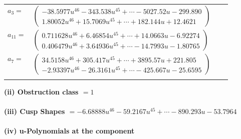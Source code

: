 \documentclass[1p]{elsarticle_modified}
\theoremstyle{definition}
\begin{document}
\begin{tabular}{m{7pt} m{180pt} m{7pt} m{180pt} }
\flushright $a_{3}=$&$\begin{pmatrix}-38.5977 u^{46}-343.538 u^{45}+\cdots-5027.52 u-299.890\\1.80052 u^{46}+15.7069 u^{45}+\cdots+182.144 u+12.4621\end{pmatrix}$ \\
\flushright $a_{11}=$&$\begin{pmatrix}0.711628 u^{46}+6.46854 u^{45}+\cdots+14.0663 u-6.92274\\0.406479 u^{46}+3.64936 u^{45}+\cdots-14.7993 u-1.80765\end{pmatrix}$ \\
\flushright $a_{7}=$&$\begin{pmatrix}34.5158 u^{46}+305.417 u^{45}+\cdots+3895.57 u+221.805\\-2.93397 u^{46}-26.3161 u^{45}+\cdots-425.667 u-25.6595\end{pmatrix}$\\&\end{tabular}
\flushleft \textbf{(ii) Obstruction class $= 1$}\\~\\
\flushleft \textbf{(iii) Cusp Shapes $= -6.68888 u^{46}-59.2167 u^{45}+\cdots-890.293 u-53.7964$}\\~\\
\newpage\renewcommand{\arraystretch}{1}
\flushleft \textbf{(iv) u-Polynomials at the component}\newline \\
\end{document}
